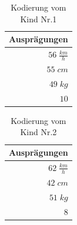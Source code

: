             \begin{multicols}{2}
                \begin{table}[H]
                    \begin{center}
                    \begin{tabular}{ |r| } 
                        \hline
                        \hfill Ausprägungen  \\ \hline
                        \cellcolor{blue!25} $ 56\; \frac{km}{h}$ \\ \hline
                        \cellcolor{yellow!25} $ 55\; cm          $ \\ \hline
                        \cellcolor{yellow!25} $ 49\; kg          $ \\ \hline
                        \cellcolor{blue!25} $  10              $ \\ \hline
                    \end{tabular}
                    \end{center}
                    \caption{Kodierung vom Kind Nr.1 \label{fig:somelabel}}
                \end{table}


                \begin{table}[H]
                    \begin{center}
                    \begin{tabular}{ |r| } 
                        \hline
                        \hfill Ausprägungen  \\ \hline
                        \cellcolor{yellow!25} $ 62\; \frac{km}{h}$ \\ \hline
                        \cellcolor{blue!25} $ 42\; cm          $ \\ \hline
                        \cellcolor{blue!25} $ 51\; kg          $ \\ \hline
                        \cellcolor{yellow!25} $  8               $ \\ \hline
                    \end{tabular}
                    \end{center}
                    \caption{Kodierung vom Kind Nr.2 \label{fig:somelabel}}
                \end{table}
            \end{multicols}

